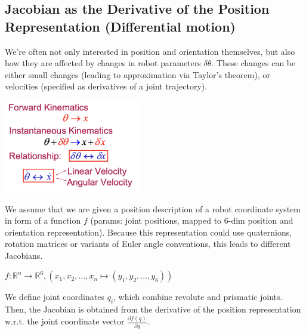 \subsection{Jacobian as the Derivative of the Position Representation (Differential motion)}
We're often not only interested in position and orientation themselves, but also how they are affected by changes in robot parameters $\delta \theta$. These changes can be either small changes (leading to approximation via Taylor’s theorem), or velocities (specified as derivatives of a joint trajectory).

\begin{center}
	\includegraphics[width=6cm]{sections/imgs/4_pos_velocities.png}
\end{center}
We assume that we are given a position description of a robot coordinate system in form of a function $f$ (params: joint positions, mapped to 6-dim position and orientation representation). Because this representation could use quaternions, rotation matrices or variants of Euler angle conventions, this leads to different Jacobians.

\begin{center}
	$f: \mathbb{R}^{n} \rightarrow \mathbb{R}^{6}, (x_1 , x_2 , ..., x_{n} \mapsto (y_1 , y_2 ,...,y_{6} ))$
\end{center}

We define joint coordinates $q_i$, which combine revolute and prismatic joints. Then, the Jacobian is obtained from the derivative of the position representation w.r.t. the joint coordinate vector $\frac{\partial f(q)}{\partial q}$.

